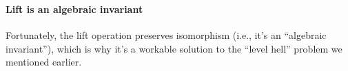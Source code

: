 \begin{code}
\AgdaSymbol{:}\AgdaSpace{}%
\AgdaSpace{}%
\AgdaSpace{}%
\AgdaSymbol{)}\<%
\\
\>[0][@{}l@{\AgdaIndent{0}}]%
\>[1]%
\>[11]\AgdaSpace{}%
\AgdaSpace{}%
\AgdaSpace{}%
\AgdaSpace{}%
\AgdaSpace{}%
\AgdaSpace{}%
\<%
\\
\>[1][@{}l@{\AgdaIndent{0}}]%
\>[10]\AgdaComment{----------------}\<%
\\
%
\>[1]%
\>[14]\AgdaSpace{}%
\AgdaSpace{}%
\<%
\\
\>[0]\AgdaSpace{}%
\AgdaSpace{}%
\AgdaSymbol{\{}\AgdaSymbol{\}}\AgdaSpace{}%
\AgdaSpace{}%
\AgdaSymbol{=}\AgdaSpace{}%
\AgdaSpace{}%
\AgdaSpace{}%
\AgdaSpace{}%
\<%
\end{code}

\paragraph{Lift is an algebraic
invariant}\label{lift-is-an-algebraic-invariant}

Fortunately, the lift operation preserves isomorphism (i.e., it's an
``algebraic invariant''), which is why it's a workable solution to the
``level hell'' problem we mentioned earlier.

